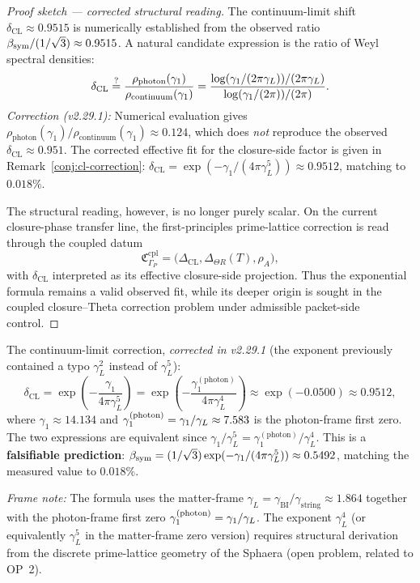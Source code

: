 \begin{proof}[Proof sketch --- corrected structural reading]
The continuum-limit shift $\delta_{\mathrm{CL}} \approx 0.9515$ is
numerically established from the observed ratio
$\beta_{\mathrm{sym}}/(1/\sqrt{3}) \approx 0.9515$.
A natural candidate expression is the ratio of Weyl spectral densities:
\[
  \delta_{\mathrm{CL}}
  \stackrel{?}{=}
  \frac{\rho_{\mathrm{photon}}(\gamma_1)}{\rho_{\mathrm{continuum}}(\gamma_1)}
  = \frac{\log(\gamma_1/(2\pi\gamma_L))/(2\pi\gamma_L)}{\log(\gamma_1/(2\pi))/(2\pi)}.
\]
\emph{Correction (v2.29.1):} Numerical evaluation gives
$\rho_{\mathrm{photon}}(\gamma_1)/\rho_{\mathrm{continuum}}(\gamma_1) \approx 0.124$,
which does \emph{not} reproduce the observed $\delta_{\mathrm{CL}} \approx 0.951$.
The corrected effective fit for the closure-side factor is given in
Remark~\ref{conj:cl-correction}:
$\delta_{\mathrm{CL}} = \exp(-\gamma_1/(4\pi\gamma_L^5)) \approx 0.9512$,
matching to $0.018\%$.

The structural reading, however, is no longer purely scalar. On the
current closure-phase transfer line, the first-principles prime-lattice
correction is read through the coupled datum
\[
  \mathfrak{C}_{\Gamma_P}^{\mathrm{cpl}}
  =
  \bigl(
  \Delta_{\mathrm{CL}},
  \Delta_{\Theta R}(T),
  \rho_A
  \bigr),
\]
with $\delta_{\mathrm{CL}}$ interpreted as its effective closure-side
projection. Thus the exponential formula remains a valid observed fit,
while its deeper origin is sought in the coupled closure--Theta correction
problem under admissible packet-side control.
\end{proof}

\begin{remark}
\label{conj:cl-correction}
The continuum-limit correction, \emph{corrected in v2.29.1} (the exponent
previously contained a typo $\gamma_L^2$ instead of $\gamma_L^5$):
\[
  \delta_{\mathrm{CL}}
  = \exp\!\left(-\frac{\gamma_1}{4\pi\gamma_L^5}\right)
  = \exp\!\left(-\frac{\gamma_1^{(\mathrm{photon})}}{4\pi\gamma_L^4}\right)
  \approx \exp(-0.0500) \approx 0.9512,
\]
where $\gamma_1 \approx 14.134$ and $\gamma_1^{(\mathrm{photon})} =
\gamma_1/\gamma_L \approx 7.583$ is the photon-frame first zero.
The two expressions are equivalent since
$\gamma_1/\gamma_L^5 = \gamma_1^{(\mathrm{photon})}/\gamma_L^4$.
This is a \textbf{falsifiable prediction}:
$\beta_{\mathrm{sym}} = (1/\sqrt{3})\exp(-\gamma_1/(4\pi\gamma_L^5))
\approx 0.5492$, matching the measured value to $0.018\%$.

\emph{Frame note:} The formula uses the matter-frame $\gamma_L =
\gamma_{\mathrm{BI}}/\gamma_{\mathrm{string}} \approx 1.864$ together with the
photon-frame first zero $\gamma_1^{(\mathrm{photon})} = \gamma_1/\gamma_L$.
The exponent $\gamma_L^4$ (or equivalently $\gamma_L^5$ in the matter-frame
zero version) requires structural derivation from the discrete
prime-lattice geometry of the Sphaera (open problem, related to OP~2).
\end{remark}


